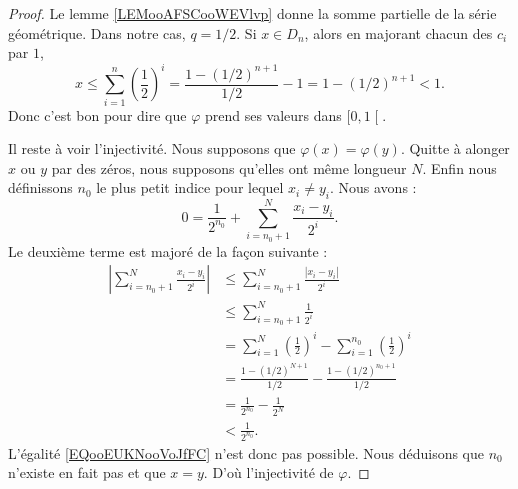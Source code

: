 \begin{proof}
	Le lemme \ref{LEMooAFSCooWEVlvp} donne la somme partielle de la série géométrique. Dans notre cas, \( q=1/2\). Si \( x\in D_n\), alors en majorant chacun des \( c_i\) par \( 1\),
	\begin{equation}
		x\leq \sum_{i=1}^n\left( \frac{ 1 }{2} \right)^i=\frac{ 1-(1/2)^{n+1} }{ 1/2 }-1=1-(1/2)^{n+1}<1.
	\end{equation}
	Donc c'est bon pour dire que \( \varphi\) prend ses valeurs dans \( \mathopen[ 0 , 1 \mathclose[\).

	Il reste à voir l'injectivité. Nous supposons que \( \varphi(x)=\varphi(y)\). Quitte à alonger \( x\) ou \( y\) par des zéros, nous supposons qu'elles ont même longueur \( N\). Enfin nous définissons \( n_0\) le plus petit indice pour lequel \( x_i\neq y_i\). Nous avons :
	\begin{equation}        \label{EQooEUKNooVoJfFC}
		0=\frac{1}{ 2^{n_0} }+\sum_{i=n_0+1}^N\frac{ x_i-y_i }{ 2^i }.
	\end{equation}
	Le deuxième terme est majoré de la façon suivante :
	\begin{subequations}
		\begin{align}
			| \sum_{i=n_0+1}^N\frac{ x_i-y_i }{ 2^i } | & \leq \sum_{i=n_0+1}^N\frac{ | x_i-y_i | }{ 2^i }                                           \\
			                                            & \leq\sum_{i=n_0+1}^N\frac{ 1 }{ 2^i }                                                      \\
			                                            & =\sum_{i=1}^N\left( \frac{ 1 }{2} \right)^i-\sum_{i=1}^{n_0}\left( \frac{ 1 }{2} \right)^i \\
			                                            & =\frac{ 1-(1/2)^{N+1} }{ 1/2 }-\frac{ 1-(1/2)^{n_0+1} }{ 1/2 }                             \\
			                                            & =\frac{1}{ 2^{n_0} }-\frac{1}{ 2^N }                                                       \\
			                                            & <\frac{1}{ 2^{n_0} }.
		\end{align}
	\end{subequations}
	L'égalité \eqref{EQooEUKNooVoJfFC} n'est donc pas possible. Nous déduisons que \( n_0\) n'existe en fait pas et que \( x=y\). D'où l'injectivité de \( \varphi\).
\end{proof}


